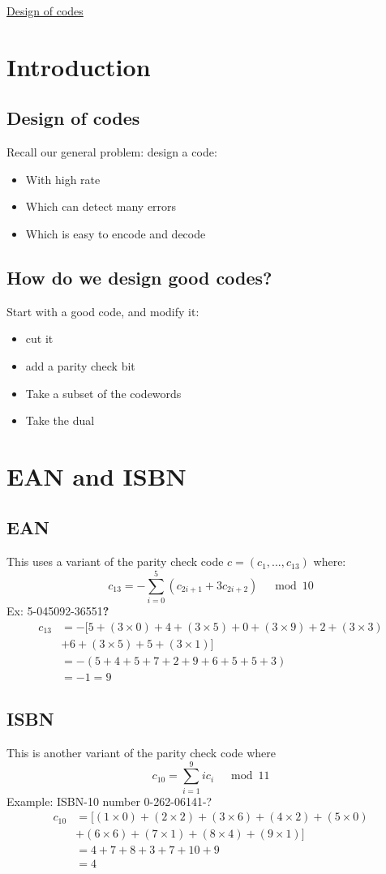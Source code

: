 \documentclass{article}[18pt]
\begin{document}
\begin{center}
\underline{\huge Design of codes}
\end{center}
\section{Introduction}
\subsection{Design of codes}
Recall our general problem: design a code:
\begin{itemize}
	\item With high rate
	\item Which can detect many errors
	\item Which is easy to encode and decode
\end{itemize}
\subsection{How do we design good codes?}
Start with a good code, and modify it:
\begin{itemize}
	\item cut it
	\item add a parity check bit
	\item Take a subset of the codewords
	\item Take the dual
\end{itemize}
\section{EAN and ISBN}
\subsection{EAN}
This uses a variant of the parity check code $c=(c_1,...,c_{13})$ where:
$$c _ { 13 } = - \sum _ { i = 0 } ^ { 5 } \left( c _ { 2 i + 1 } + 3 c _ { 2 i + 2 } \right) \quad \bmod 10$$
Ex: 5-045092-36551\textbf{?}
$$\begin{aligned} c _ { 13 } & = - [ 5 + ( 3 \times 0 ) + 4 + ( 3 \times 5 ) + 0 + ( 3 \times 9 ) + 2 + ( 3 \times 3 ) \\ & + 6 + ( 3 \times 5 ) + 5 + ( 3 \times 1 ) ] \\ & = - ( 5 + 4 + 5 + 7 + 2 + 9 + 6 + 5 + 5 + 3 ) \\ & = - 1 = 9 \end{aligned}$$
\subsection{ISBN}
This is another variant of the parity check code where 
$$c _ { 10 } = \sum _ { i = 1 } ^ { 9 } i c _ { i } \quad \bmod 11$$
Example: ISBN-10 number 0-262-06141-?
$$\begin{aligned} c _ { 10 } & = [ ( 1 \times 0 ) + ( 2 \times 2 ) + ( 3 \times 6 ) + ( 4 \times 2 ) + ( 5 \times 0 ) \\ & + ( 6 \times 6 ) + ( 7 \times 1 ) + ( 8 \times 4 ) + ( 9 \times 1 ) ] \\ & = 4 + 7 + 8 + 3 + 7 + 10 + 9 \\ & = 4 \end{aligned}$$
\end{document}
